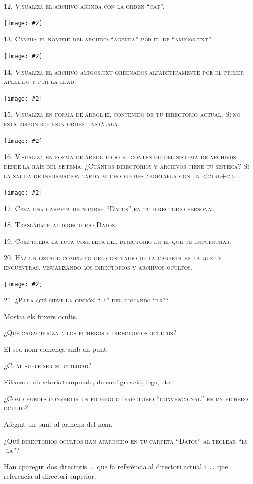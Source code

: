 \documentclass[a4paper,12pt]{article}
\newcommand{\mygraphic}[2][height=0.45\textheight]{\begin{center}
		\centering\texttt{[image: \#2]}\par
\end{center}}
\begin{document}
\newpage
\textsc{12. Visualiza el archivo agenda con la orden “cat”.}
\mygraphic{imatges/12.png}

\newpage
\textsc{13. Cambia el nombre del archivo “agenda” por el de “amigos.txt”.}
\mygraphic{imatges/13.png}

\newpage
\textsc{14. Visualiza el archivo amigos.txt ordenados alfabéticamente por el primer apellido y por la edad.}
\mygraphic{imatges/14.png}

\newpage
\textsc{15. Visualiza en forma de árbol el contenido de tu directorio actual. Si no está disponible esta orden, instálala.}
\mygraphic{imatges/15.png}

\newpage
\textsc{16. Visualiza en forma de árbol todo el contenido del sistema de archivos, desde la raíz del sistema. ¿Cuántos directorios y archivos tiene tu sistema? Si la salida de información tarda mucho puedes abortarla con un <ctrl+c>.}

\mygraphic{imatges/16.png}

\newpage
\textsc{17. Crea una carpeta de nombre “Datos” en tu directorio personal.}

\textsc{18. Trasládate al directorio Datos.}

\textsc{19. Comprueba la ruta completa del directorio en el que te encuentras.}

\textsc{20. Haz un listado completo del contenido de la carpeta en la que te encuentras, visualizando los directorios y archivos ocultos.}
\mygraphic{imatges/17-20.png}

\newpage
\textsc{21. ¿Para qué sirve la opción “-a” del comando “ls”?}

Mostra els fitxers ocults.

\textsc{¿Qué caracteriza a los ficheros y directorios ocultos?}

El seu nom comença amb un punt.

\textsc{¿Cuál suele ser su utilidad?}

Fitxers o directoris temporals, de configuració, logs, etc. 

\textsc{¿Cómo puedes convertir un fichero o directorio “convencional” en un fichero oculto?}

Afegint un punt al principi del nom.


\textsc{¿Qué directorios ocultos han aparecido en tu carpeta “Datos” al teclear “ls -la”?}

Han aparegut dos directoris. \texttt{.} que fa referència al directori actual i \texttt{..} que referencia al directori superior.
\end{document}
